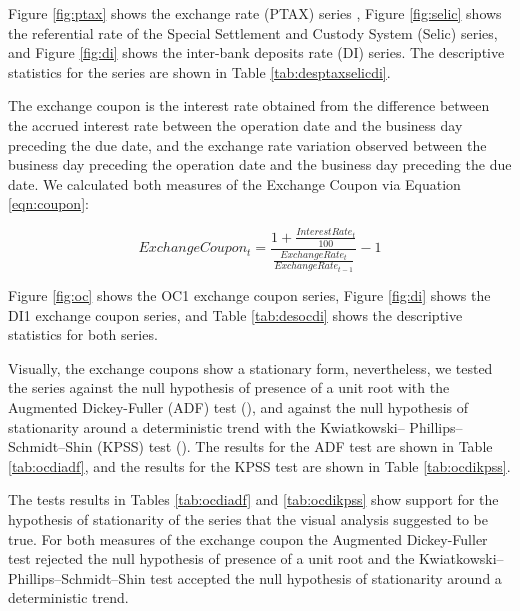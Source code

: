 \documentclass[cic,tc, english]{iiufrgs}
\begin{document}
    Figure \ref{fig:ptax} shows the exchange rate (PTAX) series , Figure \ref{fig:selic} shows the referential rate of the Special Settlement and Custody System (Selic) series, and Figure \ref{fig:di} shows the inter-bank deposits rate (DI) series. The descriptive statistics for the series are shown in Table \ref{tab:desptaxselicdi}.

    

    

    

    

    The exchange coupon is the interest rate obtained from the difference between the accrued interest rate between the operation date and the business day preceding the due date, and the exchange rate variation observed between the business day preceding the operation date and the business day preceding the due date. We calculated both measures of the Exchange Coupon via Equation \ref{eqn:coupon}:

    \begin{equation}
        \label{eqn:coupon}
        ExchangeCoupon_t = \frac{1 + \frac{InterestRate_t}{100}}{\frac{ExchangeRate_t}{ExchangeRate_{t-1}}} - 1
    \end{equation}

    Figure \ref{fig:oc} shows the OC1 exchange coupon series, Figure \ref{fig:di} shows the DI1 exchange coupon series, and Table \ref{tab:desocdi} shows the descriptive statistics for both series.

    

    

    

    Visually, the exchange coupons show a stationary form, nevertheless, we tested the series against the null hypothesis of presence of a unit root with the Augmented Dickey-Fuller (ADF) test (\citet{adf}), and against the null hypothesis of stationarity around a deterministic trend with the Kwiatkowski– Phillips–Schmidt–Shin (KPSS) test (\citet{kpss}). The results for the ADF test are shown in Table \ref{tab:ocdiadf}, and the results for the KPSS test are shown in Table \ref{tab:ocdikpss}.

    

    

    The tests results in Tables \ref{tab:ocdiadf} and \ref{tab:ocdikpss} show support for the hypothesis of stationarity of the series that the visual analysis suggested to be true. For both measures of the exchange coupon the Augmented Dickey-Fuller test rejected the null hypothesis of presence of a unit root and the Kwiatkowski– Phillips–Schmidt–Shin test accepted the null hypothesis of stationarity around a deterministic trend.
    
\end{document}
